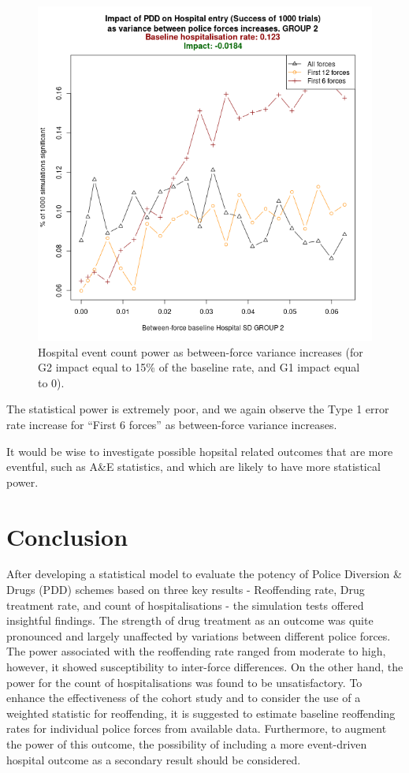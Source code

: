 \documentclass[
]{article}
\begin{document}
\begin{figure}

{\centering \includegraphics[width=0.8\linewidth]{figures/hospital_vs_pf_nogroup1_g2} 

}

\caption{Hospital event count power as between-force variance increases (for G2 impact equal to 15\% of the baseline rate, and G1 impact equal to 0).}\label{fig:hospPowerNoGroup1}
\end{figure}

The statistical power is extremely poor, and we again observe the Type 1 error rate increase for ``First 6 forces'' as between-force variance increases.

It would be wise to investigate possible hopsital related outcomes that are more eventful, such as A\&E statistics, and which are likely to have more statistical power.

\hypertarget{conclusion}{%
\section{Conclusion}\label{conclusion}}

After developing a statistical model to evaluate the potency of Police Diversion \& Drugs (PDD) schemes based on three key results - Reoffending rate, Drug treatment rate, and count of hospitalisations - the simulation tests offered insightful findings. The strength of drug treatment as an outcome was quite pronounced and largely unaffected by variations between different police forces. The power associated with the reoffending rate ranged from moderate to high, however, it showed susceptibility to inter-force differences. On the other hand, the power for the count of hospitalisations was found to be unsatisfactory. To enhance the effectiveness of the cohort study and to consider the use of a weighted statistic for reoffending, it is suggested to estimate baseline reoffending rates for individual police forces from available data. Furthermore, to augment the power of this outcome, the possibility of including a more event-driven hospital outcome as a secondary result should be considered.
\end{document}
